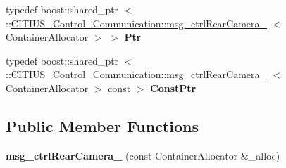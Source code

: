 \begin{DoxyCompactItemize}
\item 
\hypertarget{struct_c_i_t_i_u_s___control___communication_1_1msg__ctrl_rear_camera___a50ecf2260c695567c12775256721b027}{typedef boost\-::shared\-\_\-ptr\*
$<$ \-::\hyperlink{struct_c_i_t_i_u_s___control___communication_1_1msg__ctrl_rear_camera__}{\-C\-I\-T\-I\-U\-S\-\_\-\-Control\-\_\-\-Communication\-::msg\-\_\-ctrl\-Rear\-Camera\-\_\-}\*
$<$ \-Container\-Allocator $>$ $>$ {\bfseries \-Ptr}}\label{struct_c_i_t_i_u_s___control___communication_1_1msg__ctrl_rear_camera___a50ecf2260c695567c12775256721b027}

\item 
\hypertarget{struct_c_i_t_i_u_s___control___communication_1_1msg__ctrl_rear_camera___ae77bdf831aac0a66427363ded109db3f}{typedef boost\-::shared\-\_\-ptr\*
$<$ \-::\hyperlink{struct_c_i_t_i_u_s___control___communication_1_1msg__ctrl_rear_camera__}{\-C\-I\-T\-I\-U\-S\-\_\-\-Control\-\_\-\-Communication\-::msg\-\_\-ctrl\-Rear\-Camera\-\_\-}\*
$<$ \-Container\-Allocator $>$ const  $>$ {\bfseries \-Const\-Ptr}}\label{struct_c_i_t_i_u_s___control___communication_1_1msg__ctrl_rear_camera___ae77bdf831aac0a66427363ded109db3f}

\end{DoxyCompactItemize}
\subsection*{\-Public \-Member \-Functions}
\begin{DoxyCompactItemize}
\item 
\hypertarget{struct_c_i_t_i_u_s___control___communication_1_1msg__ctrl_rear_camera___ad9c29893424a1949b7a4c344c0dbc614}{{\bfseries msg\-\_\-ctrl\-Rear\-Camera\-\_\-} (const \-Container\-Allocator \&\-\_\-alloc)}\label{struct_c_i_t_i_u_s___control___communication_1_1msg__ctrl_rear_camera___ad9c29893424a1949b7a4c344c0dbc614}

\end{DoxyCompactItemize}
